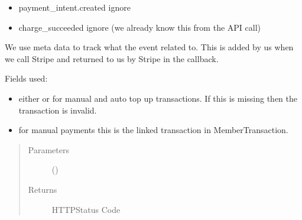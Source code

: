 \documentclass[letterpaper,10pt,english]{sphinxmanual}
\begin{document}
\begin{fulllineitems}
\begin{itemize}
\item {} 
payment\_intent.created \sphinxhyphen{} ignore

\item {} 
charge\_succeeded \sphinxhyphen{} ignore (we already know this from the API call)

\end{itemize}


We use meta data to track what the event related to. This is added by us
when we call Stripe and returned to us by Stripe in the callback.

Fields used:
\begin{itemize}
\item {} 
 \sphinxhyphen{} either  or  for manual and auto top up
transactions. If this is missing then the transaction is invalid.

\item {} 
 \sphinxhyphen{} for manual payments this is the linked transaction in
MemberTransaction.

\end{itemize}
\begin{quote}\begin{description}
\item[{Parameters}] \leavevmode
{} () \textendash{} 

\item[{Returns}] \leavevmode
HTTPStatus Code

\end{description}\end{quote}

\end{fulllineitems}

\end{document}
